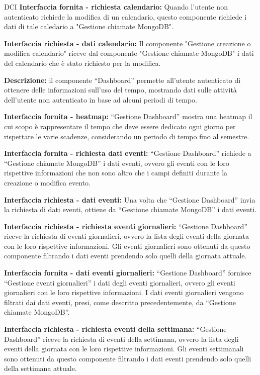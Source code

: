 \begin{listaPersonale}{DCI}
    \textbf{Interfaccia fornita - richiesta calendario: } Quando l'utente non autenticato richiede la modifica di un calendario, questo componente richiede i dati di tale caledario a "Gestione chiamate MongoDB".

    \textbf{Interfaccia richiesta - dati calendario: } Il componente "Gestione creazione o modifica calendario" riceve dal componente "Gestione chiamate MongoDB" i dati del calendario che è stato richiesto per la modifica.



    \textbf{Descrizione:} il componente “Dashboard” permette all'utente autenticato di ottenere delle informazioni sull'uso del tempo,  mostrando dati sulle attività dell'utente non autenticato in base ad alcuni periodi di tempo.

    \textbf{Interfaccia fornita - heatmap:}  “Gestione Dashboard” mostra una heatmap il cui scopo è rappresentare il tempo che deve essere dedicato ogni giorno per rispettare le varie scadenze, considerando un periodo di tempo fino al semestre.

    \textbf{Interfaccia fornita - richiesta dati eventi:} “Gestione Dashboard” richiede a “Gestione chiamate MongoDB” i dati eventi, ovvero gli eventi con le loro rispettive informazioni che non sono altro che i campi definiti durante la creazione o modifica evento.

    \textbf{Interfaccia richiesta - dati eventi:} Una volta che “Gestione Dashboard” invia la richiesta di dati eventi, ottiene da “Gestione chiamate MongoDB” i dati eventi.

    \textbf{Interfaccia richiesta - richiesta eventi giornalieri:} “Gestione Dashboard” riceve la richiesta di eventi giornalieri, ovvero la lista degli eventi della giornata con le loro rispettive informazioni.
    Gli eventi giornalieri sono ottenuti da questo componente filtrando i dati eventi prendendo solo quelli della giornata attuale.

    \textbf{Interfaccia fornita - dati eventi giornalieri:} “Gestione Dashboard” fornisce “Gestione eventi giornalieri” i dati degli eventi giornalieri, ovvero gli eventi giornalieri con le loro rispettive informazioni. I dati eventi giornalieri vengono filtrati dai dati eventi, presi, come descritto precedentemente, da “Gestione chiamate MongoDB”.

    \textbf{Interfaccia richiesta - richiesta eventi della settimana:} “Gestione Dashboard” riceve la richiesta di eventi della settimana, ovvero la lista degli eventi della giornata con le loro rispettive informazioni. Gli eventi settimanali sono ottenuti da questo componente filtrando i dati eventi prendendo solo quelli della settimana attuale.


\end{listaPersonale}
